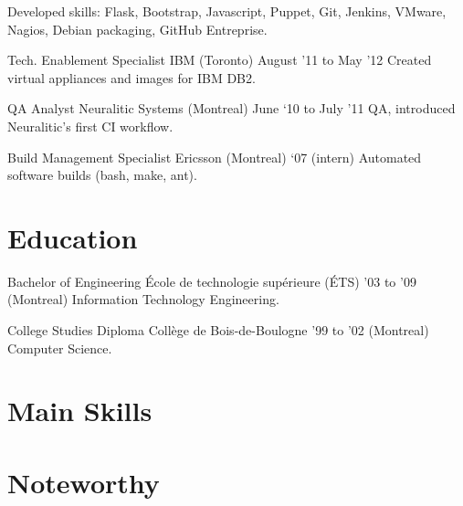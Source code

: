 \documentclass[]{cvpn}
\begin{document}
\begin{multicols}{2}
\begin{eventlist}
{Developed skills: Flask, Bootstrap, Javascript,
Puppet, Git, Jenkins, VMware, Nagios, Debian packaging,
GitHub Entreprise.
}

\item{Tech. Enablement Specialist}
     {IBM (Toronto)}
     {August '11 to May '12}
{
Created virtual appliances and images for IBM DB2.
}

\item{QA Analyst}
     {Neuralitic Systems (Montreal)}
     {June ‘10 to July ’11}
{
QA, introduced Neuralitic's first CI workflow.
}

\item{Build Management Specialist}
     {Ericsson (Montreal)}
     {‘07 (intern)}
{
Automated software builds (bash, make, ant).
}

\end{eventlist}

\section{Education}
\begin{eventlist}

\item{Bachelor of Engineering}
     {École de technologie supérieure (ÉTS)}
     {'03 to '09}
{
(Montreal) Information Technology Engineering.
}

\item{College Studies Diploma}
     {Collège de Bois-de-Boulogne}
     {'99 to '02}
{
(Montreal) Computer Science.
}

\end{eventlist}

\section{Main Skills}
\begin{skillslist}


\end{skillslist}

\section{Noteworthy}


\end{multicols}
\end{document}
